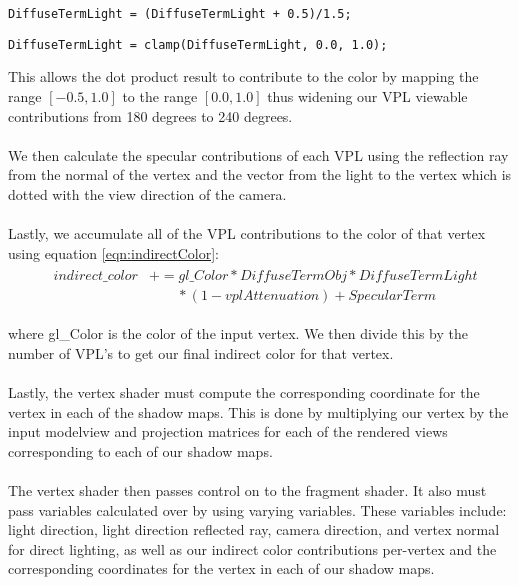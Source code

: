 \begin{lstlisting}
DiffuseTermLight = (DiffuseTermLight + 0.5)/1.5;
\end{lstlisting}

\begin{lstlisting}
DiffuseTermLight = clamp(DiffuseTermLight, 0.0, 1.0);
\end{lstlisting}

This allows the dot product result to contribute to the color by mapping the range $[-0.5, 1.0]$ to the range $[0.0, 1.0]$ thus widening our VPL viewable contributions from 180 degrees to 240 degrees.

\paragraph{}
We then calculate the specular contributions of each VPL using the reflection ray from the normal of the vertex and the vector from the light to the vertex which is dotted with the view direction of the camera.

\paragraph{}
Lastly, we accumulate all of the VPL contributions to the color of that vertex using equation \ref{eqn:indirectColor}:
\begin{align}
  &\begin{aligned} \label{eqn:indirectColor}
    indirect\_color &+= gl\_Color*DiffuseTermObj*DiffuseTermLight\\
      &\qquad *(1-vplAttenuation)+SpecularTerm
  \end{aligned}
\end{align}

where gl\_Color is the color of the input vertex.  We then divide this by the number of VPL's to get our final indirect color for that vertex.

\paragraph{}
Lastly, the vertex shader must compute the corresponding coordinate for the vertex in each of the shadow maps.  This is done by multiplying our vertex by the input modelview and projection matrices for each of the rendered views corresponding to each of our shadow maps.

\paragraph{}
The vertex shader then passes control on to the fragment shader.  It also must pass variables calculated over by using varying variables.  These variables include: light direction, light direction reflected ray, camera direction, and vertex normal for direct lighting, as well as our indirect color contributions per-vertex and the corresponding coordinates for the vertex in each of our shadow maps.

